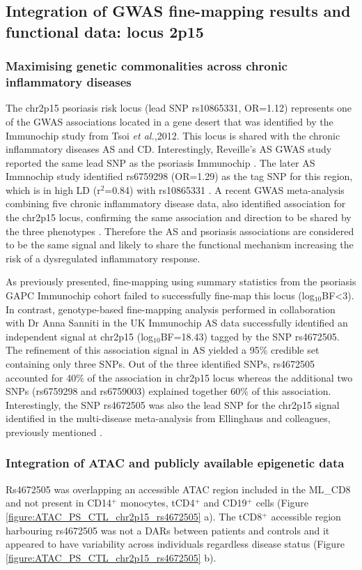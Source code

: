 \subsection{Integration of GWAS fine-mapping results and functional data: locus 2p15}

\subsubsection{Maximising genetic commonalities across chronic inflammatory diseases}
The chr2p15 psoriasis risk locus (lead SNP rs10865331, OR=1.12) represents one of the GWAS associations located in a gene desert that was identified by the Immunochip study from Tsoi \textit{et al.},2012. This locus is shared with the chronic inflammatory diseases AS and CD. Interestingly, Reveille's AS GWAS study reported the same lead SNP as the psoriasis Immunochip \parencite{Reveille2010}. The later AS Immnochip study identified rs6759298 (OR=1.29) as the tag SNP for this region, which is in high LD (r$^2$=0.84) with rs10865331 \parencite{Cortes2012}. A recent GWAS meta-analysis combining five chronic inflammatory disease data, also identified association for the chr2p15 locus, confirming the same association and direction to be shared by the three phenotypes \parencite{Ellinghaus2016}. Therefore the AS and psoriasis associations are considered to be the same signal and likely to share the functional mechanism increasing the risk of a dysregulated inflammatory response.

As previously presented, fine-mapping using summary statistics from the psoriasis GAPC Immunochip cohort failed to successfully fine-map this locus (log${_10}$BF<3). In contrast, genotype-based fine-mapping analysis performed in collaboration with Dr Anna Sanniti in the UK Immunochip AS data successfully identified an independent signal at chr2p15 (log${_10}$BF=18.43) tagged by the SNP rs4672505. The refinement of this association signal in AS yielded a 95\% credible set containing only three SNPs. Out of the three identified SNPs, rs4672505 accounted for 40\% of the association in chr2p15 locus whereas the additional two SNPs (rs6759298 and rs6759003) explained together 60\% of this association. Interestingly, the SNP rs4672505 was also the lead SNP for the chr2p15 signal identified in the multi-disease meta-analysis from Ellinghaus and colleagues, previously mentioned \parencite{Ellinghaus2016}.

\subsubsection{Integration of ATAC and publicly available epigenetic data}
Rs4672505 was overlapping an accessible ATAC region included in the ML\_CD8 and not present in CD14$^+$ monocytes, tCD4$^+$ and CD19$^+$ cells (Figure \ref{figure:ATAC_PS_CTL_chr2p15_rs4672505} a). The tCD8$^+$ accessible region harbouring rs4672505 was not a DARs between patients and controls and it appeared to have variability across individuals regardless disease status (Figure \ref{figure:ATAC_PS_CTL_chr2p15_rs4672505} b). 


